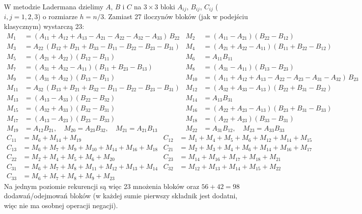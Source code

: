\documentclass[10pt,a4paper]{article}
\begin{document}
W metodzie Ladermana dzielimy $A$, $B$ i $C$ na $3\times3$ bloki $A_{ij}$, $B_{ij}$, $C_{ij}$ ($i,j=1,2,3$)
o rozmiarze $h=n/3$. Zamiast 27 iloczynów bloków (jak w podejściu klasycznym) wystarczą 23:
{\small
\begin{equation}\label{eq:laderman-m}
\begin{aligned}
M_{1}  &= (A_{11}{+}A_{12}{+}A_{13}{-}A_{21}{-}A_{22}{-}A_{32}{-}A_{33})\,B_{22} &
M_{2}  &= (A_{11}{-}A_{21})(B_{22}{-}B_{12}) \\
M_{3}  &= A_{22}\,(B_{12}{+}B_{21}{+}B_{33}{-}B_{11}{-}B_{22}{-}B_{23}{-}B_{31}) &
M_{4}  &= (A_{21}{+}A_{22}{-}A_{11})(B_{11}{+}B_{22}{-}B_{12}) \\
M_{5}  &= (A_{21}{+}A_{22})(B_{12}{-}B_{11}) &
M_{6}  &= A_{11}B_{11} \\
M_{7}  &= (A_{31}{+}A_{32}{-}A_{11})(B_{11}{+}B_{23}{-}B_{13}) &
M_{8}  &= (A_{31}{-}A_{11})(B_{13}{-}B_{23}) \\
M_{9}  &= (A_{31}{+}A_{32})(B_{13}{-}B_{11}) &
M_{10} &= (A_{11}{+}A_{12}{+}A_{13}{-}A_{22}{-}A_{23}{-}A_{31}{-}A_{32})\,B_{23} \\
M_{11} &= A_{32}\,(B_{13}{+}B_{21}{+}B_{32}{-}B_{11}{-}B_{22}{-}B_{23}{-}B_{31}) &
M_{12} &= (A_{32}{+}A_{33}{-}A_{13})(B_{22}{+}B_{31}{-}B_{32}) \\
M_{13} &= (A_{13}{-}A_{33})(B_{22}{-}B_{32}) &
M_{14} &= A_{13}B_{31} \\
M_{15} &= (A_{32}{+}A_{33})(B_{32}{-}B_{31}) &
M_{16} &= (A_{22}{+}A_{23}{-}A_{13})(B_{23}{+}B_{31}{-}B_{33}) \\
M_{17} &= (A_{13}{-}A_{23})(B_{23}{-}B_{33}) &
M_{18} &= (A_{22}{+}A_{23})(B_{33}{-}B_{31}) \\
M_{19} &= A_{12}B_{21},\quad M_{20} = A_{23}B_{32},\quad M_{21} = A_{21}B_{13} &
M_{22} &= A_{31}B_{12},\quad M_{23} = A_{33}B_{33}
\end{aligned}
\end{equation}
\begin{equation}\label{eq:laderman-c}
\begin{aligned}
C_{11} &= M_6{+}M_{14}{+}M_{19} &
C_{12} &= M_1{+}M_4{+}M_5{+}M_6{+}M_{12}{+}M_{14}{+}M_{15} \\
C_{13} &= M_6{+}M_7{+}M_9{+}M_{10}{+}M_{14}{+}M_{16}{+}M_{18} &
C_{21} &= M_2{+}M_3{+}M_4{+}M_6{+}M_{14}{+}M_{16}{+}M_{17} \\
C_{22} &= M_2{+}M_4{+}M_5{+}M_6{+}M_{20} &
C_{23} &= M_{14}{+}M_{16}{+}M_{17}{+}M_{18}{+}M_{21} \\
C_{31} &= M_6{+}M_7{+}M_8{+}M_{11}{+}M_{12}{+}M_{13}{+}M_{14} &
C_{32} &= M_{12}{+}M_{13}{+}M_{14}{+}M_{15}{+}M_{22} \\
C_{33} &= M_6{+}M_7{+}M_8{+}M_9{+}M_{23}
\end{aligned}
\end{equation}
}%
Na jednym poziomie rekurencji są więc 23 mnożenia bloków oraz $56+42=98$ dodawań/odejmowań bloków
(w każdej sumie pierwszy składnik jest dodatni, więc nie ma osobnej operacji negacji).
\end{document}

